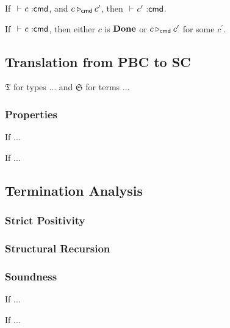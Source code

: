 \begin{theorem}[Preservation]
  If $\typecmd{}{c}$, and $c \triangleright_{\mathsf{cmd}} c^{\prime}$, then $\typecmd{}{c^{\prime}}$.
\end{theorem}

\begin{theorem}[Progress]
  If $\typecmd{}{c}$, then either $c$ is $\mathbf{Done}$ or $c \triangleright_{\mathsf{cmd}} c^{\prime}$ for some $c^{\prime}$.
\end{theorem}

\subsection{Translation from PBC to SC}

$\mathfrak{T}$ for types ... and $\mathfrak{S}$ for terms ...

\subsubsection{Properties}

\begin{lemma}[...]
  If ...
\end{lemma}

\begin{theorem}[Preservation]
  If ...
\end{theorem}

\subsection{Termination Analysis}

\subsubsection{Strict Positivity}

\subsubsection{Structural Recursion}

\subsubsection{Soundness}

\begin{lemma}[...]
  If ...
\end{lemma}

\begin{theorem}[Soundness]
  If ...
\end{theorem}

